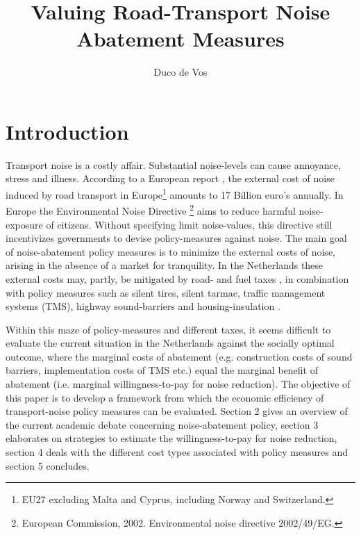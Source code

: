 \documentclass[a4paper]{scrartcl}
\title{Valuing Road-Transport Noise Abatement Measures}
\author{Duco de Vos}
\begin{document}
\maketitle

\section{Introduction}

Transport noise is a costly affair. Substantial noise-levels can cause annoyance, stress and illness.   According to a European report \citep{CEDelft2011}, the external cost of noise induced by road transport in Europe\footnote{EU27 excluding Malta and Cyprus, including Norway and Switzerland.} amounts to 17 Billion euro’s annually. In Europe the Environmental Noise Directive \footnote{European Commission, 2002. Environmental noise directive 2002/49/EG.} aims to reduce harmful noise-exposure of citizens. Without specifying limit noise-values, this directive still incentivizes governments to devise policy-measures against noise. The main goal of noise-abatement policy measures is to minimize the external costs of noise, arising in the absence of a market for tranquility. In the Netherlands these external costs may, partly, be mitigated by road- and fuel taxes \citep{Andersson2013}, in combination with policy measures such as silent tires, silent tarmac, traffic management systems (TMS), highway sound-barriers and housing-insulation \citep{RIVM2001}.

Within this maze of policy-measures and different taxes, it seems difficult to evaluate the current situation in the Netherlands against the socially optimal outcome, where the marginal costs of abatement (e.g. construction costs of sound barriers, implementation costs of TMS etc.) equal the marginal benefit of abatement (i.e. marginal willingness-to-pay for noise reduction). The objective of this paper is to develop a framework from which the economic efficiency of transport-noise policy measures can be evaluated. Section 2 gives an overview of the current academic debate concerning noise-abatement policy, section 3 elaborates on strategies to estimate the willingness-to-pay for noise reduction, section 4 deals with the different cost types associated with policy measures and section 5 concludes.
\end{document}
